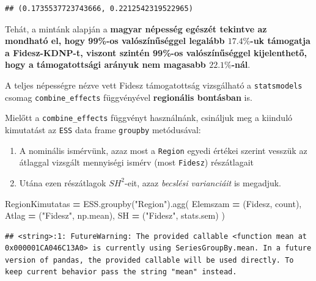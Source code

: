 \documentclass[
]{book}
\newenvironment{Shaded}{\begin{snugshade}}{\end{snugshade}}
\newcommand{\NormalTok}[1]{#1}
\newcommand{\OperatorTok}[1]{\textcolor[rgb]{0.81,0.36,0.00}{\textbf{#1}}}
\newcommand{\StringTok}[1]{\textcolor[rgb]{0.31,0.60,0.02}{#1}}
\providecommand{\tightlist}{%
  \setlength{\itemsep}{0pt}\setlength{\parskip}{0pt}}
\begin{document}
\begin{verbatim}
## (0.1735537723743666, 0.2212542319522965)
\end{verbatim}

Tehát, a mintánk alapján a \textbf{magyar népesség egészét tekintve az mondható el, hogy 99\%-os valószínűséggel legalább \(17.4\%\)-uk támogatja a Fidesz-KDNP-t, viszont szintén 99\%-os valószínűséggel kijelenthető, hogy a támogatottsági arányuk nem magasabb \(22.1\%\)-nál}.

A teljes népességre nézve vett Fidesz támogatottság vizsgálható a \texttt{statsmodels} csomag \texttt{combine\_effects} függvényével \textbf{regionális bontásban} is.

Mielőtt a \texttt{combine\_effects} függvényt használnánk, csináljuk meg a kiinduló kimutatást az \texttt{ESS} data frame \texttt{groupby} metódusával:

\begin{enumerate}
\def\labelenumi{\arabic{enumi}.}
\tightlist
\item
  A nominális ismérvünk, azaz most a \texttt{Region} egyedi értékei szerint vesszük az átlaggal vizsgált mennyiségi ismérv (most \texttt{Fidesz}) részátlagait
\item
  Utána ezen részátlagok \(SH^2\)-eit, azaz \emph{becslési varianciáit} is megadjuk.
\end{enumerate}

\begin{Shaded}
\begin{Highlighting}[]
\NormalTok{RegionKimutatas }\OperatorTok{=}\NormalTok{ ESS.groupby(}\StringTok{"Region"}\NormalTok{).agg(}
\NormalTok{  Elemszam }\OperatorTok{=}\NormalTok{ (}\StringTok{\textquotesingle{}Fidesz\textquotesingle{}}\NormalTok{, }\StringTok{\textquotesingle{}count\textquotesingle{}}\NormalTok{),}
\NormalTok{  Atlag }\OperatorTok{=}\NormalTok{ (}\StringTok{"Fidesz"}\NormalTok{, np.mean),}
\NormalTok{  SH }\OperatorTok{=}\NormalTok{ (}\StringTok{"Fidesz"}\NormalTok{, stats.sem)}
\NormalTok{)}
\end{Highlighting}
\end{Shaded}

\begin{verbatim}
## <string>:1: FutureWarning: The provided callable <function mean at 0x000001CA046C13A0> is currently using SeriesGroupBy.mean. In a future version of pandas, the provided callable will be used directly. To keep current behavior pass the string "mean" instead.
\end{verbatim}
\end{document}
